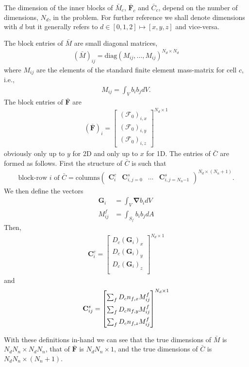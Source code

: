 \documentclass[10pt,letterpaper,notitlepage]{article}
\numberwithin{equation}{section}
\newcommand{\bnabla}{\boldsymbol{\nabla}}
\newcommand{\RadF}{\boldsymbol{\mathcal{F}}}
\newcommand{\RadJ}{\RadF_0}
\newcommand{\beqn}{\begin{equation}\begin{aligned}}
\newcommand{\eeqn}{\end{aligned}\end{equation}}
\begin{document}
 The dimension of the inner blocks of $\bar{M}_c$, $\bar{\mathbf{F}}_c$ and $\bar{C}_c$, depend on the number of dimensions, $N_d$, in the problem. For further reference we shall denote dimensions with $d$ but it generally refers to $d\in[0,1,2] \mapsto [x,y,z]$ and vice-versa. 
 
 The block entries of $\bar{M}$ are small diagonal matrices,
 \beqn 
(\bar{M})_{ij} = \text{diag}(M_{ij}, \dots,  M_{ij})^{N_d{\times}N_d}
 \eeqn 
 where $M_{ij}$ are the elements of the standard finite element mass-matrix for cell $c$, i.e.,
 \beqn 
 M_{ij} = \int_V b_i b_j dV.
 \eeqn 
The block entries of $\bar{\mathbf{F}}$ are
\beqn 
(\bar{\mathbf{F}})_i = 
\begin{bmatrix}
	(\RadJ)_{i,x} \\ 	(\RadJ)_{i,y} \\ 	(\RadJ)_{i,z}
\end{bmatrix}^{N_d{\times}1}
\eeqn 
obviously only up to $y$ for 2D and only up to $x$ for 1D.
The entries of $\bar{C}$ are formed as follows. First the structure of $\bar{C}$ is such that
\beqn 
\text{block-row }i\text{ of }
\bar{C} =
\text{columns}
\begin{pmatrix}
	\mathbf{C}_{i}^c & \mathbf{C}_{i,j=0}^s & \dots & \mathbf{C}_{i,j=N_n{-1}}^s
\end{pmatrix}^{N_d{\times}(N_n + 1)}.
\eeqn 
We then define the vectors
\beqn 
\mathbf{G}_i &= \int_V \bnabla b_i dV \\
M_{ij}^f &= \int_{S_f}  b_i b_j dA
\eeqn 
Then, 
\beqn 
\mathbf{C}_{i}^c =\begin{bmatrix}
D_c(\mathbf{G}_i)_x \\
D_c(\mathbf{G}_i)_y \\
D_c(\mathbf{G}_i)_z \\
\end{bmatrix}^{N_d{\times}1}
\eeqn 
and 
\beqn 
	\renewcommand*{\arraystretch}{1.5}
\mathbf{C}_{ij}^s = \begin{bmatrix}

\sum_f D_c n_{f,x} M_{ij}^f \\
\sum_f D_c n_{f,y} M_{ij}^f \\
\sum_f D_c n_{f,z} M_{ij}^f
\end{bmatrix}^{N_d{\times}1}
\eeqn 

With these definitions in-hand we can see that the true dimensions of $\bar{M}$ is $N_d N_n {\times} N_d N_n$, that of $\bar{\mathbf{F}}$ is $N_d N_n {\times}1$, and the true dimensions of $\bar{C}$ is $N_d N_n {\times} (N_n+1)$. 
\end{document}

